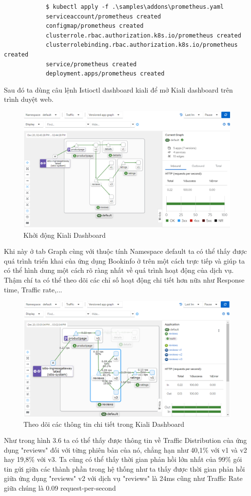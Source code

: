 \documentclass[12pt,a4paper]{report}
\begin{document}
{{\begin{lstlisting}
			$ kubectl apply -f .\samples\addons\prometheus.yaml
			serviceaccount/prometheus created
			configmap/prometheus created
			clusterrole.rbac.authorization.k8s.io/prometheus created
			clusterrolebinding.rbac.authorization.k8s.io/prometheus created
			service/prometheus created
			deployment.apps/prometheus created
		\end{lstlisting}
		Sau đó ta dùng câu lệnh {\color{red}Istioctl dashboard kiali} để mở Kiali dashboard trên trình duyệt web.
		\begin{figure}[h]
			\centering
			\includegraphics[width=0.7\linewidth]{Pics/3.3.2-1}
			\caption{Khởi động Kiali Dashboard}
			\label{fig:3}
		\end{figure}
		Khi này ở tab Graph cùng với thuộc tính Namespace default ta có thể thấy được quá trình triển khai của ứng dụng Bookinfo ở trên một cách trực tiếp và giúp ta có thể hình dung một cách rõ ràng nhất về quá trình hoạt động của dịch vụ.
		Thậm chí ta có thể theo dõi các chỉ số hoạt động chi tiết hơn nữa như Response time, Traffic rate,... 
		\begin{figure}[h]
			\centering
			\includegraphics[width=0.7\linewidth]{Pics/3.3.2-2}
			\caption{Theo dõi các thông tin chi tiết trong Kiali Dashboard}
			\label{fig:3.4-2}
		\end{figure}
		
		Như trong hình 3.6 ta có thể thấy được thông tin về Traffic Distribution của ứng dụng "reviews" đối với từng phiên bản của nó, chẳng hạn như 40,1\% với v1 và v2 hay 19,8\% với v3. Ta cũng có thể thấy thời gian phản hồi lớn nhất của 99\% gói tin gửi giữa các thành phần trong hệ thống như ta thấy được thời gian phản hồi giữa ứng dụng "reviews" v2 với dịch vụ "reviews" là 24ms cũng như Traffic Rate giữa chúng là 0.09 request-per-second 
}}
\end{document}
